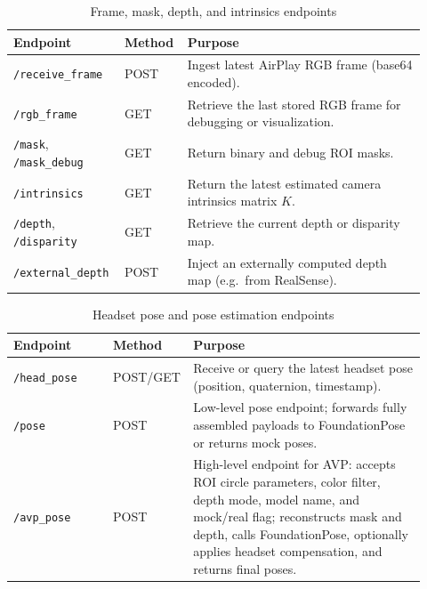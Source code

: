 \begin{table}[H]
    \centering
    \caption{Frame, mask, depth, and intrinsics endpoints}
    \label{tab:endpoints-frame}
    \begin{tabular}{p{0.24\linewidth}p{0.11\linewidth}p{0.57\linewidth}}
        \toprule
        \textbf{Endpoint} & \textbf{Method} & \textbf{Purpose} \\
        \midrule
        \texttt{/receive\_frame} & POST &
        Ingest latest AirPlay RGB frame (base64 encoded). \\
        \texttt{/rgb\_frame} & GET &
        Retrieve the last stored RGB frame for debugging or visualization. \\
        \texttt{/mask}, \texttt{/mask\_debug} & GET &
        Return binary and debug ROI masks. \\
        \texttt{/intrinsics} & GET &
        Return the latest estimated camera intrinsics matrix $K$. \\
        \texttt{/depth}, \texttt{/disparity} & GET &
        Retrieve the current depth or disparity map. \\
        \texttt{/external\_depth} & POST &
        Inject an externally computed depth map (e.g.\ from RealSense). \\
        \bottomrule
    \end{tabular}
\end{table}

\begin{table}[H]
    \centering
    \caption{Headset pose and pose estimation endpoints}
    \label{tab:endpoints-pose}
    \begin{tabular}{p{0.24\linewidth}p{0.11\linewidth}p{0.57\linewidth}}
        \toprule
        \textbf{Endpoint} & \textbf{Method} & \textbf{Purpose} \\
        \midrule
        \texttt{/head\_pose} & POST/GET &
        Receive or query the latest headset pose (position, quaternion, timestamp). \\
        \texttt{/pose} & POST &
        Low-level pose endpoint; forwards fully assembled payloads to FoundationPose or returns mock poses. \\
        \texttt{/avp\_pose} & POST &
        High-level endpoint for AVP: accepts ROI circle parameters, color filter, depth mode, model name, and mock/real flag; reconstructs mask and depth, calls FoundationPose, optionally applies headset compensation, and returns final poses. \\
        \bottomrule
    \end{tabular}
\end{table}

